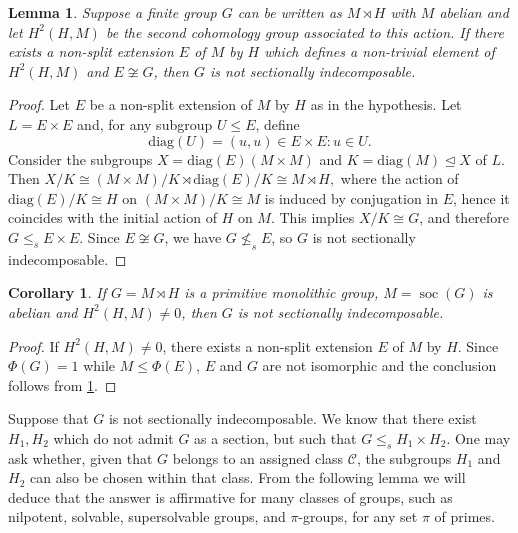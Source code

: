 \documentclass[a4paper,10pt]{amsart}
\theoremstyle{plain}
\newtheorem{corollary}[thm]{Corollary}
\newtheorem{lemma}[thm]{Lemma}
\theoremstyle{definition}
\DeclareMathOperator{\soc}{soc}
\begin{document}
\begin{lemma}\label{l:H2}
Suppose a finite group $G$ can be written as $M \rtimes H$ with $M$ abelian and let $H^2(H,M)$ be the second cohomology group associated to this action. If there exists a non-split extension $E$ of $M$ by $H$ which defines a non-trivial element of $H^2(H,M)$ and $E\not\cong G$, then $G$ is not sectionally indecomposable.
\end{lemma}
\begin{proof}
Let $E$ be a non-split extension of $M$ by $H$ as in the hypothesis. Let $L = E \times E$ and, for any subgroup $U \leq E$, define
$$\mathrm{diag}(U) = {(u,u) \in E \times E : u \in U}.$$
Consider the subgroups $X = \mathrm{diag}(E)(M \times M)$ and $K = \mathrm{diag}(M) \unlhd X$ of $L$. Then
$X/K \cong (M \times M)/K \rtimes \mathrm{diag}(E)/K \cong M \rtimes H,$
where the action of $\mathrm{diag}(E)/K \cong H$ on $(M \times M)/K \cong M$ is induced by conjugation in $E$, hence it coincides with the initial action of $H$ on $M$. This implies $X/K \cong G$, and therefore $G \leq_s E \times E$. Since $E \not\cong G$, we have $G \not\leq_s E$, so $G$ is not sectionally indecomposable.
\end{proof}





\begin{corollary}\label{l:H2m}
   If $G=M\rtimes H$ is a primitive monolithic group,  $M=\soc(G)$ is abelian and $H^2(H,M) \neq 0$, then $G$ is not sectionally indecomposable.
\end{corollary}
\begin{proof}
If $H^2(H,M) \neq 0$, there exists a non-split extension $E$ of $M$ by $H$. Since $\Phi(G) = 1$ while $M \leq \Phi(E)$, $E$ and $G$ are not isomorphic and the conclusion follows from \cref{l:H2}.
\end{proof}

Suppose that $G$ is not sectionally indecomposable. We know that there exist $H_1, H_2$ which do not admit $G$ as a section, 
but such that $G \leq_s H_1 \times H_2$. One may ask whether, given that 
$G$ belongs to an assigned class $\mathcal{C}$, the subgroups $H_1$ and 
$H_2$ can also be chosen within that class. From the following lemma we 
will deduce that the answer is affirmative for many classes of groups, 
such as nilpotent, solvable, supersolvable groups, and $\pi$-groups, for 
any set $\pi$ of primes.
\end{document}
